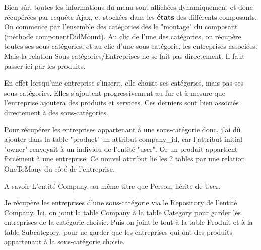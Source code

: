 Bien sûr, toutes les informations du menu sont affichées dynamiquement et donc récupérées par requête Ajax, et stockées dans les \textbf{états} des différents composants.\\
On commence par l'ensemble des catégories dès le "montage" du composant (méthode componentDidMount).
Au clic de l'une des catégories, on récupère toutes ses sous-catégories, et au clic d'une sous-catégorie, les entreprises associées.
Mais la relation Sous-catégories/Entreprises ne se fait pas directement. 
Il faut passer ici par les produits. 
\begin{myboxedtext}
En effet lorsqu'une entreprise s'inscrit, elle choisit ses catégories, mais pas ses sous-catégories. Elles s'ajoutent progressivement au fur et à mesure que l'entreprise ajoutera des produits et services.
Ces derniers sont bien associés directement à des sous-catégories.
\end{myboxedtext}

Pour récupérer les entreprises appartenant à une sous-catégorie donc, j'ai dû ajouter dans la table "product" un attribut company\_id, car l'attribut initial "owner" renvoyait à un individu de l'entité "user". 
Or un produit appartient forcément à une entreprise. 
Ce nouvel attribut lie les 2 tables par une relation OneToMany du côté de l'entreprise.

\begin{callout}{A savoir}
    L'entité Company, au même titre que Person, hérite de User.
\end{callout}


Je récupère les entreprises d'une sous-catégorie via le Repository de l'entité Company.
Ici, on joint la table Company à la table Category pour garder les entreprises de la catégorie choisie.
Puis on joint le tout à la table Produit et à la table Subcategory, pour ne garder que les entreprises qui ont des produits appartenant à la sous-catégorie choisie.\\

